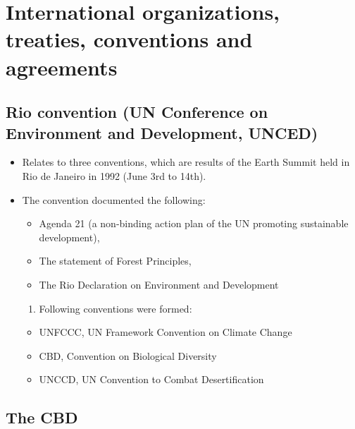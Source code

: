\documentclass[
]{book}
\providecommand{\tightlist}{%
  \setlength{\itemsep}{0pt}\setlength{\parskip}{0pt}}
\begin{document}
\hypertarget{international-organizations-treaties-conventions-and-agreements}{%
\chapter{International organizations, treaties, conventions and agreements}\label{international-organizations-treaties-conventions-and-agreements}}

\hypertarget{rio-convention-un-conference-on-environment-and-development-unced}{%
\section{Rio convention (UN Conference on Environment and Development, UNCED)}\label{rio-convention-un-conference-on-environment-and-development-unced}}

\begin{itemize}
\tightlist
\item
  Relates to three conventions, which are results of the Earth Summit held in Rio de Janeiro in 1992 (June 3rd to 14th).
\item
  The convention documented the following:

  \begin{itemize}
  \tightlist
  \item
    Agenda 21 (a non-binding action plan of the UN promoting sustainable development),
  \item
    The statement of Forest Principles,
  \item
    The Rio Declaration on Environment and Development
  \end{itemize}

  \begin{enumerate}
  \def\labelenumi{\arabic{enumi}.}
  \setcounter{enumi}{61}
  \tightlist
  \item
    Following conventions were formed:
  \end{enumerate}

  \begin{itemize}
  \tightlist
  \item
    UNFCCC, UN Framework Convention on Climate Change
  \item
    CBD, Convention on Biological Diversity
  \item
    UNCCD, UN Convention to Combat Desertification
  \end{itemize}
\end{itemize}

\hypertarget{the-cbd}{%
\section{The CBD}\label{the-cbd}}
\end{document}
